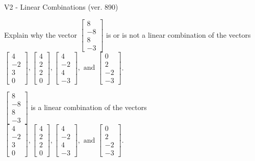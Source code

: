 \begin{exercise}
  \begin{exerciseTitle}V2 - Linear Combinations (ver. 890)\end{exerciseTitle}
  \begin{exerciseStatement}
    Explain why the vector \(\left[\begin{array}{c}
8 \\
-8 \\
8 \\
-3
\end{array}\right]\)  is or is not a linear 
	combination of the vectors \(\left[\begin{array}{c}
4 \\
-2 \\
3 \\
0
\end{array}\right] , \left[\begin{array}{c}
4 \\
2 \\
2 \\
0
\end{array}\right] , \left[\begin{array}{c}
4 \\
-2 \\
4 \\
-3
\end{array}\right] , \text{ and } \left[\begin{array}{c}
0 \\
2 \\
-2 \\
-3
\end{array}\right]\).
	


  \end{exerciseStatement}
  \begin{exerciseAnswer}
   \(\left[\begin{array}{c}
8 \\
-8 \\
8 \\
-3
\end{array}\right]\) 
  	 is  
	a linear combination of the vectors \(\left[\begin{array}{c}
4 \\
-2 \\
3 \\
0
\end{array}\right] , \left[\begin{array}{c}
4 \\
2 \\
2 \\
0
\end{array}\right] , \left[\begin{array}{c}
4 \\
-2 \\
4 \\
-3
\end{array}\right] , \text{ and } \left[\begin{array}{c}
0 \\
2 \\
-2 \\
-3
\end{array}\right]\).


\end{exerciseAnswer}
\end{exercise}
